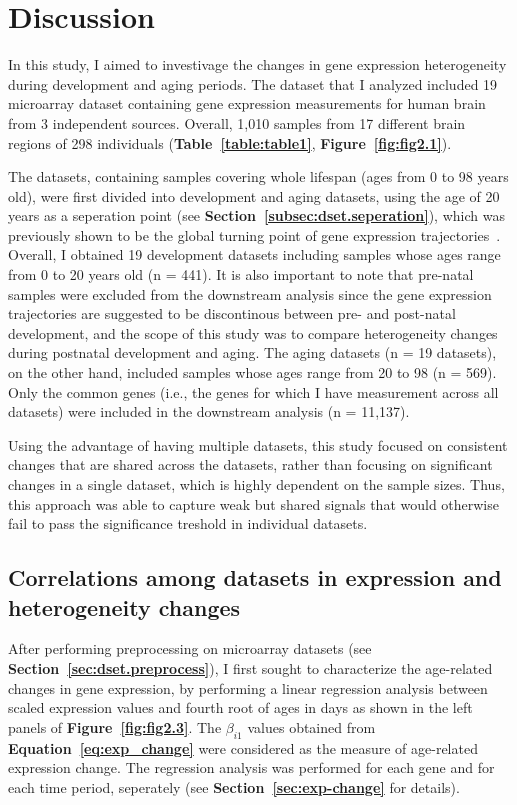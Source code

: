 \chapter{Discussion}
\label{chp:b4}

In this study, I aimed to investivage the changes in gene expression heterogeneity during development and aging periods.
The dataset that I analyzed included 19 microarray dataset containing gene expression measurements for human brain from 3 independent sources.
Overall, 1,010 samples from 17 different brain regions of 298 individuals (\textbf{Table~\ref{table:table1}}, \textbf{Figure~\ref{fig:fig2.1}}).

The datasets, containing samples covering whole lifespan (ages from 0 to 98 years old), 
were first divided into development and aging datasets,
using the age of 20 years as a seperation point (see \textbf{Section~\ref{subsec:dset.seperation}}), 
which was previously shown to be the global turning point of gene expression trajectories~\cite{Donertas2017, Colantuoni2011, Somel2010}.
Overall, I obtained 19 development datasets including samples whose ages range from 0 to 20 years old (n = 441).
It is also important to note that pre-natal samples were excluded from the downstream analysis
since the gene expression trajectories are suggested to be discontinous between pre- and post-natal development, 
and the scope of this study was to compare heterogeneity changes during postnatal development and aging.
The aging datasets (n = 19 datasets), on the other hand, included samples whose ages range from 20 to 98 (n = 569).
Only the common genes (i.e., the genes for which I have measurement across all datasets) were included in the downstream analysis (n = 11,137).

Using the advantage of having multiple datasets, this study focused on consistent changes that are shared across the datasets, 
rather than focusing on significant changes in a single dataset, which is highly dependent on the sample sizes. 
Thus, this approach was able to capture weak but shared signals that would otherwise fail to pass the significance treshold in individual datasets.

\section{Correlations among datasets in expression and heterogeneity changes}
After performing preprocessing on microarray datasets (see \textbf{Section~\ref{sec:dset.preprocess}}), 
I first sought to characterize the age-related changes in gene expression, 
by performing a linear regression analysis between scaled expression values and 
fourth root of ages in days as shown in the left panels of \textbf{Figure~\ref{fig:fig2.3}}.
The $\beta_{i1}$ values obtained from \textbf{Equation~\ref{eq:exp_change}} were considered as the measure of age-related expression change.
The regression analysis was performed for each gene and for each time period, seperately (see \textbf{Section~\ref{sec:exp-change}} for details).

